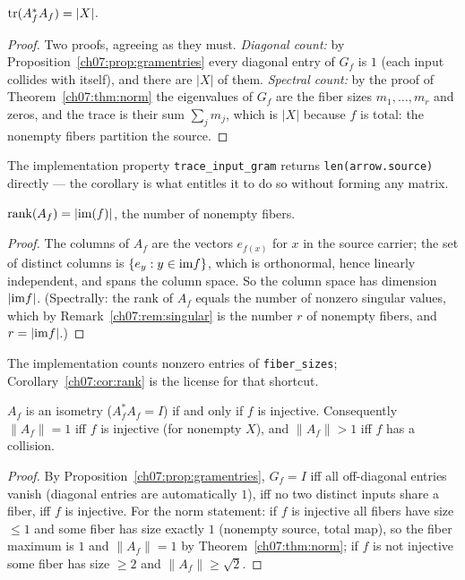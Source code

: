 \begin{corollary}\label{ch07:cor:trace}
$\mathrm{tr}(A_f^*A_f)=|X|$.
\end{corollary}

\begin{proof}
Two proofs, agreeing as they must. \emph{Diagonal count:} by
Proposition~\ref{ch07:prop:gramentries} every diagonal entry of $G_f$ is $1$
(each input collides with itself), and there are $|X|$ of them.
\emph{Spectral count:} by the proof of Theorem~\ref{ch07:thm:norm} the
eigenvalues of $G_f$ are the fiber sizes $m_1,\dots,m_r$ and zeros, and the
trace is their sum $\sum_j m_j$, which is $|X|$ because $f$ is total: the
nonempty fibers partition the source.
\end{proof}

The implementation property \texttt{trace\_input\_gram} returns
\texttt{len(arrow.source)} directly --- the corollary is what entitles it to
do so without forming any matrix.

\begin{corollary}[Rank]\label{ch07:cor:rank}
$\mathrm{rank}(A_f)=|\mathrm{im}(f)|$, the number of nonempty fibers.
\end{corollary}

\begin{proof}
The columns of $A_f$ are the vectors $e_{f(x)}$ for $x$ in the source
carrier; the set of distinct columns is $\{e_y : y\in \mathrm{im} f\}$, which is
orthonormal, hence linearly independent, and spans the column space. So the
column space has dimension $|\mathrm{im} f|$. (Spectrally: the rank of $A_f$ equals
the number of nonzero singular values, which by
Remark~\ref{ch07:rem:singular} is the number $r$ of nonempty fibers, and
$r=|\mathrm{im} f|$.)
\end{proof}

The implementation counts nonzero entries of \texttt{fiber\_sizes};
Corollary~\ref{ch07:cor:rank} is the license for that shortcut.

\begin{corollary}\label{ch07:cor:isometry}
$A_f$ is an isometry ($A_f^*A_f=I$) if and only if $f$ is injective.
Consequently $\lVert A_f\rVert=1$ iff $f$ is injective (for nonempty $X$),
and $\lVert A_f\rVert>1$ iff $f$ has a collision.
\end{corollary}

\begin{proof}
By Proposition~\ref{ch07:prop:gramentries}, $G_f=I$ iff all off-diagonal
entries vanish (diagonal entries are automatically $1$), iff no two distinct
inputs share a fiber, iff $f$ is injective. For the norm statement: if $f$ is
injective all fibers have size $\le 1$ and some fiber has size exactly $1$
(nonempty source, total map), so the fiber maximum is $1$ and
$\lVert A_f\rVert=1$ by Theorem~\ref{ch07:thm:norm}; if $f$ is not injective
some fiber has size $\ge 2$ and $\lVert A_f\rVert\ge\sqrt{2}$.
\end{proof}

